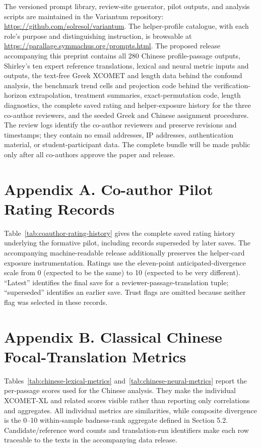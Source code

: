 \documentclass[
  12pt,
]{article}
\begin{document}
The versioned prompt library, review-site generator, pilot outputs, and
analysis scripts are maintained in the Variantum repository:
\url{https://github.com/solresol/variantum}. The helper-profile
catalogue, with each role's purpose and distinguishing instruction, is
browsable at \url{https://parallage.symmachus.org/prompts.html}. The
proposed release accompanying
this preprint contains all 280 Chinese profile-passage outputs,
Shirley's ten expert reference translations, lexical and neural metric
inputs and outputs, the text-free Greek XCOMET and length data behind
the confound analysis, the benchmark trend cells and projection code
behind the verification-horizon extrapolation, treatment summaries,
exact-permutation code, length diagnostics, the complete saved rating
and helper-exposure history for the three co-author reviewers, and the
seeded Greek and Chinese assignment procedures. The review logs identify the co-author reviewers
and preserve revisions and timestamps; they contain no email addresses,
IP addresses, authentication material, or student-participant data. The
complete bundle will be made public only after all co-authors approve
the paper and release.

\clearpage
\begin{landscape}
\section{Appendix A. Co-author Pilot Rating
Records}\label{appendix-coauthor-ratings}

Table~\ref{tab:coauthor-rating-history} gives the complete saved rating
history underlying the formative pilot, including records superseded by
later saves. The accompanying machine-readable release additionally
preserves the helper-card exposure instrumentation. Ratings use the
eleven-point anticipated-divergence scale from 0 (expected to be the
same) to 10 (expected to be very different). ``Latest'' identifies the
final save for a reviewer-passage-translation tuple; ``superseded''
identifies an earlier save. Trust flags are omitted because neither flag
was selected in these records.



\clearpage
\section{Appendix B. Classical Chinese Focal-Translation
Metrics}\label{appendix-chinese-metrics}

Tables~\ref{tab:chinese-lexical-metrics}
and~\ref{tab:chinese-neural-metrics} report the per-passage scores used
for the Chinese analysis. They make the individual XCOMET-XL and related
scores visible rather than reporting only correlations and aggregates.
All individual metrics are similarities, while composite divergence is
the 0--10 within-sample badness-rank aggregate defined in Section 5.2.
Candidate/reference word counts and translation-run identifiers make
each row traceable to the texts in the accompanying data release.


\end{landscape}
\end{document}
